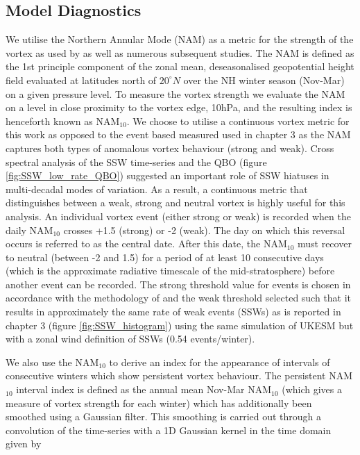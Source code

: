 \subsection{Model Diagnostics}
\label{sec:model_diagnostics_surface}
We utilise the Northern Annular Mode (NAM) as a metric for the strength of the vortex as used by \cite{baldwinStratospheric2001a} as well as numerous subsequent studies. The NAM is defined as the 1st principle component of the zonal mean, deseasonalised geopotential height field evaluated at latitudes north of $20^{\circ}N$ over the NH winter season (Nov-Mar) on a given pressure level. To measure the vortex strength we evaluate the NAM on a level in close proximity to the vortex edge, 10hPa, and the resulting index is henceforth known as NAM$_{10}$. We choose to utilise a continuous vortex metric for this work as opposed to the event based measured used in chapter 3 as the NAM captures both types of anomalous vortex behaviour (strong and weak). Cross spectral analysis of the SSW time-series and the QBO (figure \ref{fig:SSW_low_rate_QBO}) suggested an important role of SSW hiatuses in multi-decadal modes of variation. As a result, a continuous metric that distinguishes between a weak, strong and neutral vortex is highly useful for this analysis. An individual vortex event (either strong or weak) is recorded when the daily NAM$_{10}$ crosses +1.5 (strong) or -2 (weak). The day on which this reversal occurs is referred to as the central date. After this date, the NAM$_10$ must recover to neutral (between -2 and 1.5) for a period of at least 10 consecutive days (which is the approximate radiative timescale of the mid-stratosphere) before another event can be recorded. The strong threshold value for events is chosen in accordance with the methodology of \cite{baldwinStratospheric2001a} and the weak threshold selected such that it results in approximately the same rate of weak events (SSWs) as is reported in chapter 3 (figure \ref{fig:SSW_histogram}) using the same simulation of UKESM but with a zonal wind definition of SSWs (0.54 events/winter).

We also use the NAM$_{10}$ to derive an index for the appearance of intervals of consecutive winters which show persistent vortex behaviour. The persistent NAM$_{10}$ interval index is defined as the annual mean Nov-Mar NAM$_{10}$ (which gives a measure of vortex strength for each winter) which has additionally been smoothed using a Gaussian filter. This smoothing is carried out through a convolution of the time-series with a 1D Gaussian kernel in the time domain given by

